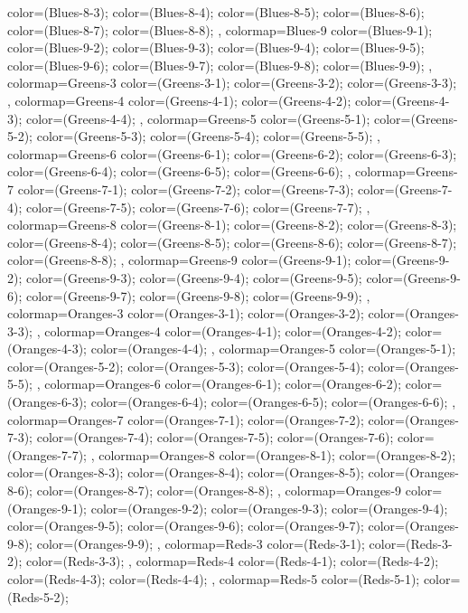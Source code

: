 {{color=(Blues-8-3);
color=(Blues-8-4);
color=(Blues-8-5);
color=(Blues-8-6);
color=(Blues-8-7);
color=(Blues-8-8);
},
colormap={Blues-9}{
color=(Blues-9-1);
color=(Blues-9-2);
color=(Blues-9-3);
color=(Blues-9-4);
color=(Blues-9-5);
color=(Blues-9-6);
color=(Blues-9-7);
color=(Blues-9-8);
color=(Blues-9-9);
},
colormap={Greens-3}{
color=(Greens-3-1);
color=(Greens-3-2);
color=(Greens-3-3);
},
colormap={Greens-4}{
color=(Greens-4-1);
color=(Greens-4-2);
color=(Greens-4-3);
color=(Greens-4-4);
},
colormap={Greens-5}{
color=(Greens-5-1);
color=(Greens-5-2);
color=(Greens-5-3);
color=(Greens-5-4);
color=(Greens-5-5);
},
colormap={Greens-6}{
color=(Greens-6-1);
color=(Greens-6-2);
color=(Greens-6-3);
color=(Greens-6-4);
color=(Greens-6-5);
color=(Greens-6-6);
},
colormap={Greens-7}{
color=(Greens-7-1);
color=(Greens-7-2);
color=(Greens-7-3);
color=(Greens-7-4);
color=(Greens-7-5);
color=(Greens-7-6);
color=(Greens-7-7);
},
colormap={Greens-8}{
color=(Greens-8-1);
color=(Greens-8-2);
color=(Greens-8-3);
color=(Greens-8-4);
color=(Greens-8-5);
color=(Greens-8-6);
color=(Greens-8-7);
color=(Greens-8-8);
},
colormap={Greens-9}{
color=(Greens-9-1);
color=(Greens-9-2);
color=(Greens-9-3);
color=(Greens-9-4);
color=(Greens-9-5);
color=(Greens-9-6);
color=(Greens-9-7);
color=(Greens-9-8);
color=(Greens-9-9);
},
colormap={Oranges-3}{
color=(Oranges-3-1);
color=(Oranges-3-2);
color=(Oranges-3-3);
},
colormap={Oranges-4}{
color=(Oranges-4-1);
color=(Oranges-4-2);
color=(Oranges-4-3);
color=(Oranges-4-4);
},
colormap={Oranges-5}{
color=(Oranges-5-1);
color=(Oranges-5-2);
color=(Oranges-5-3);
color=(Oranges-5-4);
color=(Oranges-5-5);
},
colormap={Oranges-6}{
color=(Oranges-6-1);
color=(Oranges-6-2);
color=(Oranges-6-3);
color=(Oranges-6-4);
color=(Oranges-6-5);
color=(Oranges-6-6);
},
colormap={Oranges-7}{
color=(Oranges-7-1);
color=(Oranges-7-2);
color=(Oranges-7-3);
color=(Oranges-7-4);
color=(Oranges-7-5);
color=(Oranges-7-6);
color=(Oranges-7-7);
},
colormap={Oranges-8}{
color=(Oranges-8-1);
color=(Oranges-8-2);
color=(Oranges-8-3);
color=(Oranges-8-4);
color=(Oranges-8-5);
color=(Oranges-8-6);
color=(Oranges-8-7);
color=(Oranges-8-8);
},
colormap={Oranges-9}{
color=(Oranges-9-1);
color=(Oranges-9-2);
color=(Oranges-9-3);
color=(Oranges-9-4);
color=(Oranges-9-5);
color=(Oranges-9-6);
color=(Oranges-9-7);
color=(Oranges-9-8);
color=(Oranges-9-9);
},
colormap={Reds-3}{
color=(Reds-3-1);
color=(Reds-3-2);
color=(Reds-3-3);
},
colormap={Reds-4}{
color=(Reds-4-1);
color=(Reds-4-2);
color=(Reds-4-3);
color=(Reds-4-4);
},
colormap={Reds-5}{
color=(Reds-5-1);
color=(Reds-5-2);
}}
